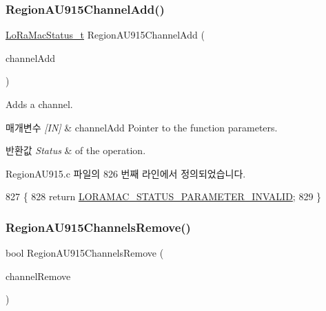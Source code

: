 \subsubsection{\texorpdfstring{Region\+A\+U915\+Channel\+Add()}{RegionAU915ChannelAdd()}}
{\footnotesize\ttfamily \mbox{\hyperlink{group___l_o_r_a_m_a_c_ga30bd25657e10480f8605ee951b0ecfbd}{Lo\+Ra\+Mac\+Status\+\_\+t}} Region\+A\+U915\+Channel\+Add (\begin{DoxyParamCaption}\item[{\mbox{\hyperlink{group___r_e_g_i_o_n_gab1c5f3aa06614283202906cef4417860}{Channel\+Add\+Params\+\_\+t}} $\ast$}]{channel\+Add }\end{DoxyParamCaption})}



Adds a channel. 


\begin{DoxyParams}{매개변수}
{\em \mbox{[}\+I\+N\mbox{]}} & channel\+Add Pointer to the function parameters.\\
\hline
\end{DoxyParams}

\begin{DoxyRetVals}{반환값}
{\em Status} & of the operation. \\
\hline
\end{DoxyRetVals}


Region\+A\+U915.\+c 파일의 826 번째 라인에서 정의되었습니다.


\begin{DoxyCode}
827 \{
828     \textcolor{keywordflow}{return} \mbox{\hyperlink{group___l_o_r_a_m_a_c_gga1d18f26b344040b3ec5c3db662919661ad0d3119f247d00e1787dda106fcb3017}{LORAMAC\_STATUS\_PARAMETER\_INVALID}};
829 \}
\end{DoxyCode}
\mbox{\label{group___r_e_g_i_o_n_a_u915_ga4dfd376f684a40c659c69bf127a71a71}} 
\subsubsection{\texorpdfstring{Region\+A\+U915\+Channels\+Remove()}{RegionAU915ChannelsRemove()}}
{\footnotesize\ttfamily bool Region\+A\+U915\+Channels\+Remove (\begin{DoxyParamCaption}\item[{\mbox{\hyperlink{group___r_e_g_i_o_n_gaa37468560d2fc81a977b57a48e5d72c0}{Channel\+Remove\+Params\+\_\+t}} $\ast$}]{channel\+Remove }\end{DoxyParamCaption})}



